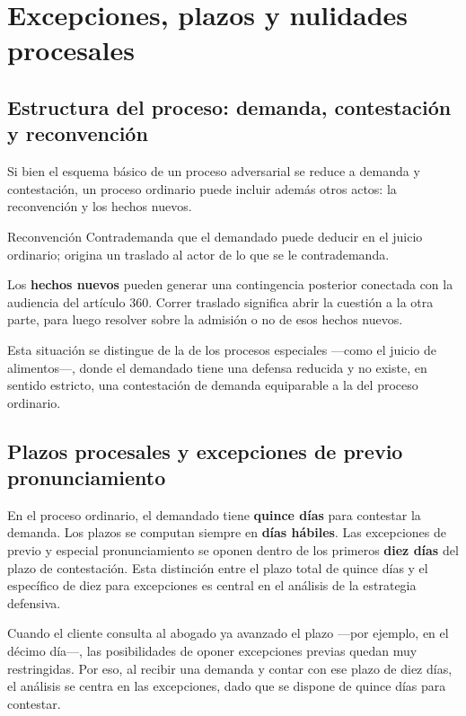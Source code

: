 \documentclass[12pt,oneside]{book}
\begin{document}
\chapter[Excepciones, plazos y nulidades]{Excepciones, plazos y nulidades procesales}

\section{Estructura del proceso: demanda, contestación y reconvención}

Si bien el esquema básico de un proceso adversarial se reduce a demanda y contestación, un proceso ordinario puede incluir además otros actos: la reconvención y los hechos nuevos.

\begin{definition}{Reconvención}
Contrademanda que el demandado puede deducir en el juicio ordinario; origina un traslado al actor de lo que se le contrademanda.
\end{definition}

Los \textbf{hechos nuevos} pueden generar una contingencia posterior conectada con la audiencia del artículo 360. Correr traslado significa abrir la cuestión a la otra parte, para luego resolver sobre la admisión o no de esos hechos nuevos.

Esta situación se distingue de la de los procesos especiales ---como el juicio de alimentos---, donde el demandado tiene una defensa reducida y no existe, en sentido estricto, una contestación de demanda equiparable a la del proceso ordinario.

\section{Plazos procesales y excepciones de previo pronunciamiento}

En el proceso ordinario, el demandado tiene \textbf{quince días} para contestar la demanda. Los plazos se computan siempre en \textbf{días hábiles}. Las excepciones de previo y especial pronunciamiento se oponen dentro de los primeros \textbf{diez días} del plazo de contestación. Esta distinción entre el plazo total de quince días y el específico de diez para excepciones es central en el análisis de la estrategia defensiva.

Cuando el cliente consulta al abogado ya avanzado el plazo ---por ejemplo, en el décimo día---, las posibilidades de oponer excepciones previas quedan muy restringidas. Por eso, al recibir una demanda y contar con ese plazo de diez días, el análisis se centra en las excepciones, dado que se dispone de quince días para contestar.
\end{document}
